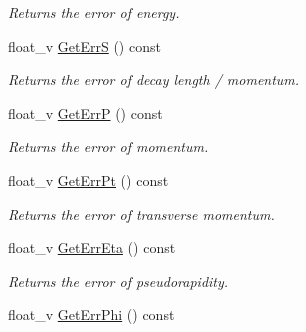\begin{DoxyCompactItemize}
\begin{DoxyCompactList}\small\item\em Returns the error of energy. \end{DoxyCompactList}\item 
float\+\_\+v \hyperlink{classKFParticleSIMD_a628e6f0aa1fd791274b4e3b94ff0404a}{Get\+ErrS} () const \hypertarget{classKFParticleSIMD_a628e6f0aa1fd791274b4e3b94ff0404a}{}\label{classKFParticleSIMD_a628e6f0aa1fd791274b4e3b94ff0404a}

\begin{DoxyCompactList}\small\item\em Returns the error of decay length / momentum. \end{DoxyCompactList}\item 
float\+\_\+v \hyperlink{classKFParticleSIMD_a9531e40fb9ae49f4fc7f2344a2977072}{Get\+ErrP} () const \hypertarget{classKFParticleSIMD_a9531e40fb9ae49f4fc7f2344a2977072}{}\label{classKFParticleSIMD_a9531e40fb9ae49f4fc7f2344a2977072}

\begin{DoxyCompactList}\small\item\em Returns the error of momentum. \end{DoxyCompactList}\item 
float\+\_\+v \hyperlink{classKFParticleSIMD_a398ff53645050d8527c3c77781f9be0e}{Get\+Err\+Pt} () const \hypertarget{classKFParticleSIMD_a398ff53645050d8527c3c77781f9be0e}{}\label{classKFParticleSIMD_a398ff53645050d8527c3c77781f9be0e}

\begin{DoxyCompactList}\small\item\em Returns the error of transverse momentum. \end{DoxyCompactList}\item 
float\+\_\+v \hyperlink{classKFParticleSIMD_ad9ce07062930794c651c1c14b9a92c8b}{Get\+Err\+Eta} () const \hypertarget{classKFParticleSIMD_ad9ce07062930794c651c1c14b9a92c8b}{}\label{classKFParticleSIMD_ad9ce07062930794c651c1c14b9a92c8b}

\begin{DoxyCompactList}\small\item\em Returns the error of pseudorapidity. \end{DoxyCompactList}\item 
float\+\_\+v \hyperlink{classKFParticleSIMD_a38af99b90699ed86707db793a4c24a4d}{Get\+Err\+Phi} () const \hypertarget{classKFParticleSIMD_a38af99b90699ed86707db793a4c24a4d}{}\label{classKFParticleSIMD_a38af99b90699ed86707db793a4c24a4d}


\end{DoxyCompactItemize}
